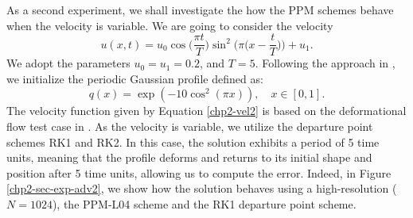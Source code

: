 As a second experiment, we shall investigate the how the PPM schemes behave when the velocity
is variable.  We are going to consider the velocity
\begin{equation}
	\label{chp2-vel2}
	u(x,t) = u_0\cos{\bigg(\frac{\pi t}{T}\bigg)}\sin^2\bigg(\pi \bigg(x-\frac{t}{T}\bigg)\bigg) + u_1.
\end{equation}
We adopt the parameters $u_0 = u_1 = 0.2$,  and $T = 5$.
Following the approach in \citet{trefethen:2000}, we initialize the periodic Gaussian profile defined as:
\begin{equation}
	\label{chp2-ic2}
	q(x) = \exp(-10\cos^2 (\pi x)),\quad x \in [0,1].
\end{equation}
The velocity function given by Equation \eqref{chp2-vel2} is based
on the deformational flow test case in \citet{nair:2010}.
As the velocity is variable, we utilize the departure point schemes RK1 and RK2.
In this case, the solution exhibits a period of 5 time units,
meaning that the profile deforms and returns to its initial shape
and position after 5 time units, allowing us to compute the error.
Indeed, in Figure \ref{chp2-sec-exp-adv2}, we show how the solution behaves
using a high-resolution ($N=1024$), the PPM-L04 scheme and the RK1 departure point scheme.

